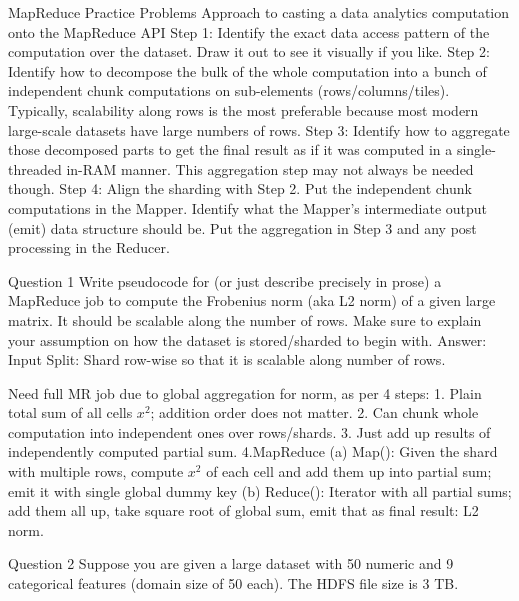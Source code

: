 MapReduce Practice Problems
  Approach to casting a data analytics computation onto the MapReduce API
    Step 1: Identify the exact data access pattern of the computation over the dataset. Draw it out to see it visually if you like.  
    Step 2: Identify how to decompose the bulk of the whole computation into a bunch of independent chunk computations on sub-elements (rows/columns/tiles). Typically, scalability along rows is the most preferable because most modern large-scale datasets have large numbers of rows.
    Step 3: Identify how to aggregate those decomposed parts to get the final result as if it was computed in a single-threaded in-RAM manner. This aggregation step may not always be needed though.
    Step 4: Align the sharding with Step 2. Put the independent chunk computations in the Mapper. Identify what the Mapper's intermediate output (emit) data structure should be. Put the aggregation in Step 3 and any post processing in the Reducer.

  Question 1
  Write pseudocode for (or just describe precisely in prose) a MapReduce job to compute the Frobenius norm (aka L2 norm) of a given large matrix. It should be scalable along the number of rows. Make sure to explain your assumption on how the dataset is stored/sharded to begin with.
  Answer:
  Input Split: Shard row-wise so that it is scalable along number of rows.

  Need full MR job due to global aggregation for norm, as per 4 steps: 
    1. Plain total sum of all cells $x^2$; addition order does not matter. 
    2. Can chunk whole computation into independent ones over rows/shards. 
    3. Just add up results of independently computed partial sum.
    4.MapReduce
      (a) Map(): Given the shard with multiple rows, compute $x^2$ of each cell and add them up into partial sum; emit it with single global dummy key 
      (b) Reduce(): Iterator with all partial sums; add them all up, take square root of global sum, emit that as final result: L2 norm.

  Question 2
  Suppose you are given a large dataset with 50 numeric and 9 categorical features (domain size of 50 each). The HDFS file size is 3 TB.

